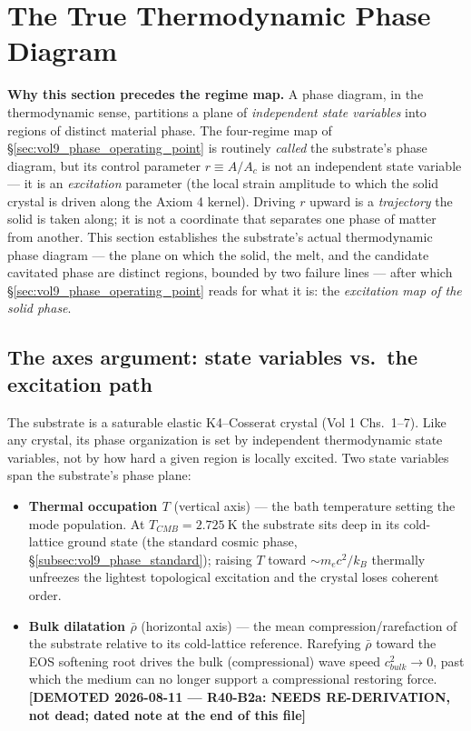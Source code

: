 \section{The True Thermodynamic Phase Diagram}
\label{sec:vol9_true_phase_diagram}

\textbf{Why this section precedes the regime map.} A phase diagram, in the thermodynamic sense, partitions a plane of \emph{independent state variables} into regions of distinct material phase. The four-regime map of \S\ref{sec:vol9_phase_operating_point} is routinely \emph{called} the substrate's phase diagram, but its control parameter $r \equiv A/A_c$ is not an independent state variable --- it is an \emph{excitation} parameter (the local strain amplitude to which the solid crystal is driven along the Axiom 4 kernel). Driving $r$ upward is a \emph{trajectory} the solid is taken along; it is not a coordinate that separates one phase of matter from another. This section establishes the substrate's actual thermodynamic phase diagram --- the plane on which the solid, the melt, and the candidate cavitated phase are distinct regions, bounded by two failure lines --- after which \S\ref{sec:vol9_phase_operating_point} reads for what it is: the \emph{excitation map of the solid phase}.

\subsection{The axes argument: state variables vs.\ the excitation path}
\label{subsec:vol9_true_phase_axes}

The substrate is a saturable elastic K4--Cosserat crystal (Vol 1 Chs.~1--7). Like any crystal, its phase organization is set by independent thermodynamic state variables, not by how hard a given region is locally excited. Two state variables span the substrate's phase plane:

\begin{itemize}
    \item \textbf{Thermal occupation $T$} (vertical axis) --- the bath temperature setting the mode population. At $T_{CMB} = \qty{2.725}{\kelvin}$ the substrate sits deep in its cold-lattice ground state (the standard cosmic phase, \S\ref{subsec:vol9_phase_standard}); raising $T$ toward $\sim m_e c^2/k_B$ thermally unfreezes the lightest topological excitation and the crystal loses coherent order.
    \item \textbf{Bulk dilatation $\bar\rho$} (horizontal axis) --- the mean compression/rarefaction of the substrate relative to its cold-lattice reference. Rarefying $\bar\rho$ toward the EOS softening root drives the bulk (compressional) wave speed $c_{bulk}^2 \to 0$, past which the medium can no longer support a compressional restoring force. \textbf{[DEMOTED 2026-08-11 --- R40-B2a: NEEDS RE-DERIVATION, not dead; dated note at the end of this file]}
\end{itemize}

